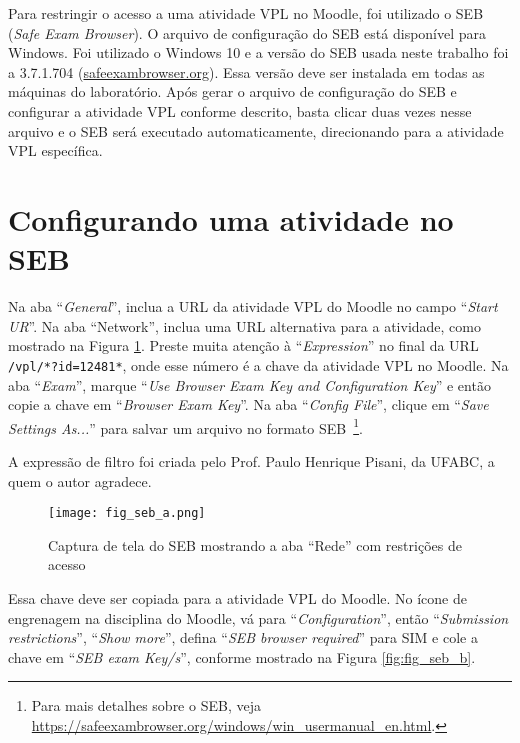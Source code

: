 \label{ch:apendiceC}

Para restringir o acesso a uma atividade VPL no Moodle, foi utilizado o SEB (\textit{Safe Exam Browser}). O arquivo de configuração do SEB está disponível para Windows. Foi utilizado o Windows 10 e a versão do SEB usada neste trabalho foi a 3.7.1.704 (\href{https://safeexambrowser.org/}{safeexambrowser.org}). Essa versão deve ser instalada em todas as máquinas do laboratório. Após gerar o arquivo de configuração do SEB e configurar a atividade VPL conforme descrito, basta clicar duas vezes nesse arquivo e o SEB será executado automaticamente, direcionando para a atividade VPL específica.

\section{Configurando uma atividade no SEB}

Na aba ``\textit{General}'', inclua a URL da atividade VPL do Moodle no campo ``\textit{Start UR}''. Na aba ``Network'', inclua uma URL alternativa para a atividade, como mostrado na Figura \ref{fig:fig_seb_a}. Preste muita atenção à ``\textit{Expression}'' no final da URL \verb|/vpl/*?id=12481*|, onde esse número é a chave da atividade VPL no Moodle. Na aba ``\textit{Exam}'', marque ``\textit{Use Browser Exam Key and Configuration Key}'' e então copie a chave em ``\textit{Browser Exam Key}''. Na aba ``\textit{Config File}'', clique em ``\textit{Save Settings As...}'' para salvar um arquivo no formato SEB~\footnote{Para mais detalhes sobre o SEB, veja \url{https://safeexambrowser.org/windows/win_usermanual_en.html}.}.

A expressão de filtro foi criada pelo Prof. Paulo Henrique Pisani, da UFABC, a quem o autor agradece.

\begin{figure}[!ht]
\centering
\texttt{[image: fig\_seb\_a.png]}
\caption{Captura de tela do SEB mostrando a aba ``Rede'' com restrições de acesso}
\label{fig:fig_seb_a}
\end{figure}

Essa chave deve ser copiada para a atividade VPL do Moodle. No ícone de engrenagem na disciplina do Moodle, vá para ``\textit{Configuration}'', então ``\textit{Submission restrictions}'', ``\textit{Show more}'', defina ``\textit{SEB browser required}'' para SIM e cole a chave em ``\textit{SEB exam Key/s}'', conforme mostrado na Figura \ref{fig:fig_seb_b}.

